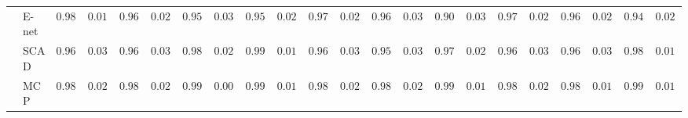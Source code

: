 \begin{tabular}{ll|ll|llllll|llllll|llllll}
 & E-net  & $0.9854$ & $0.0169$ & $0.9671$ & $0.0289$ & $0.9566$ & $0.0310$ & $0.9568$ & $0.0293$ & $0.9778$ & $0.0286$ & $0.9668$ & $0.0346$ & $0.9011$ & $0.0391$ & $0.9767$ & $0.0247$ & $0.9620$ & $0.0222$ & $0.9465$ & $0.0267$ \\
 & SCAD  & $0.9625$ & $0.0383$ & $0.9676$ & $0.0355$ & $0.9800$ & $0.0231$ & $0.9953$ & $0.0156$ & $0.9605$ & $0.0388$ & $0.9570$ & $0.0375$ & $0.9791$ & $0.0280$ & $0.9631$ & $0.0373$ & $0.9645$ & $0.0304$ & $0.9883$ & $0.0170$ \\
 & MCP  & $0.9866$ & $0.0200$ & $0.9877$ & $0.0210$ & $0.9959$ & $0.0094$ & $0.9958$ & $0.0144$ & $0.9869$ & $0.0235$ & $0.9849$ & $0.0223$ & $0.9916$ & $0.0135$ & $0.9849$ & $0.0203$ & $0.9881$ & $0.0145$ & $0.9929$ & $0.0130$ \\
\hline 
\end{tabular}

